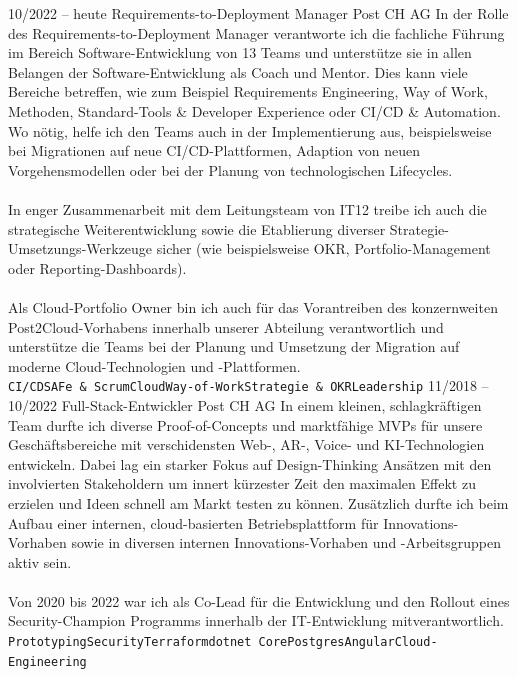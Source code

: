 \documentclass[10pt]{developercv} %
\begin{document}

\begin{entrylist}
	\entry
	{\footnotesize 10/2022 -- heute}
	{Requirements-to-Deployment Manager}
	{Post CH AG}
	{In der Rolle des Requirements-to-Deployment Manager verantworte ich die fachliche Führung im Bereich Software-Entwicklung von 13 Teams und unterstütze sie in allen Belangen der Software-Entwicklung als Coach und Mentor. Dies kann viele Bereiche betreffen, wie zum Beispiel Requirements Engineering, Way of Work, Methoden, Standard-Tools \& Developer Experience oder CI/CD \& Automation. Wo nötig, helfe ich den Teams auch in der Implementierung aus, beispielsweise bei Migrationen auf neue CI/CD-Plattformen, Adaption von neuen Vorgehensmodellen oder bei der Planung von technologischen Lifecycles.\\ \\
		In enger Zusammenarbeit mit dem Leitungsteam von IT12 treibe ich auch die strategische Weiterentwicklung sowie die Etablierung diverser Strategie-Umsetzungs-Werkzeuge sicher (wie beispielsweise OKR, Portfolio-Management oder Reporting-Dashboards).\\ \\
		Als Cloud-Portfolio Owner bin ich auch für das  Vorantreiben des konzernweiten Post2Cloud-Vorhabens innerhalb unserer Abteilung verantwortlich und unterstütze die Teams bei der Planung und Umsetzung der Migration auf moderne Cloud-Technologien und -Plattformen.\\ \small \texttt{CI/CD}\slashsep\texttt{SAFe \& Scrum}\slashsep\texttt{Cloud}\slashsep\texttt{Way-of-Work}\slashsep\texttt{Strategie \& OKR}\slashsep\texttt{Leadership}}
	\entry
	{\footnotesize 11/2018 -- 10/2022}
	{Full-Stack-Entwickler}
	{Post CH AG}
	{In einem kleinen, schlagkräftigen Team durfte ich diverse Proof-of-Concepts und marktfähige MVPs für unsere Geschäftsbereiche mit verschidensten Web-, AR-, Voice- und KI-Technologien entwickeln. Dabei lag ein starker Fokus auf Design-Thinking Ansätzen mit den involvierten Stakeholdern um innert kürzester Zeit den maximalen Effekt zu erzielen und Ideen schnell am Markt testen zu können. Zusätzlich durfte ich beim Aufbau einer internen, cloud-basierten Betriebsplattform für Innovations-Vorhaben sowie in diversen internen Innovations-Vorhaben und -Arbeitsgruppen aktiv sein.\\ \\Von 2020 bis 2022 war ich als Co-Lead für die Entwicklung und den Rollout eines Security-Champion Programms innerhalb der IT-Entwicklung mitverantwortlich.\\ \small \texttt{Prototyping}\slashsep\texttt{Security}\slashsep\texttt{Terraform}\slashsep\texttt{dotnet Core}\slashsep\texttt{Postgres}\slashsep\texttt{Angular}\slashsep\texttt{Cloud-Engineering}}

\end{entrylist}
\end{document}
